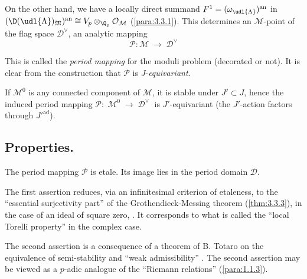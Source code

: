 \begin{para}\label{para:6.1.4}
 On the other hand, we have a locally direct summand
 $F^1=(\omega_{\udl{\Lambda}})^{\mathrm{an}}$ in
 $(\D(\udl{\Lambda})_{\mathfrak{M}})^{\mathrm{an}}\cong
 V_p\otimes_{\Q_p}\mathcal{O}_\mathcal{M}$ (\ref{para:3.3.1}). This
 determines an 
 $\mathcal{M}$-point of the flag space $\mathcal{D}^\vee$, \ie an
 analytic mapping 
 \begin{equation*}
  \mathcal{P}:\mathcal{M}\;\longrightarrow \;\mathcal{D}^\vee
 \end{equation*}

 This is called the {\it period mapping} for the moduli problem
 (decorated or not). It is clear from the construction that $\mathcal{P}$ is
 $J$-{\it equivariant}.


 If $\mathcal{M}^0$ is any connected component of $\mathcal{M}$, it is
 stable under $J'\subset J$, hence the induced period mapping
 $\mathcal{P}:\;\mathcal{M}^0\;\longrightarrow \;\mathcal{D}^\vee\;$ is
 $J'$-equivariant (the $J'$-action factors through ${J'}^{\mathrm{ad}}$).
\end{para}

\subsection{Properties.}\label{sub:6.2}  

\begin{thm}\label{thm:6.2.1} The period mapping $\mathcal{P}$ is etale. Its image lies in the period domain $\mathcal{D}$. 


\end{thm}
The first assertion reduces, via an infinitesimal criterion of
etaleness, to the ``essential surjectivity part'' of the
Grothendieck-Messing theorem (\ref{thm:3.3.3}), in the case of an ideal
of square zero, \cf \cite[5.17]{psfpg}.  It corresponds to what is called
the ``local Torelli property'' in the complex case.


The second assertion is a
consequence of a theorem of B. Totaro on the equivalence of semi-stability and ``weak admissibility'' \cite{tpipht}.
The second assertion may be viewed as a
$p$-adic analogue of the ``Riemann relations'' (\ref{para:1.1.3}).

